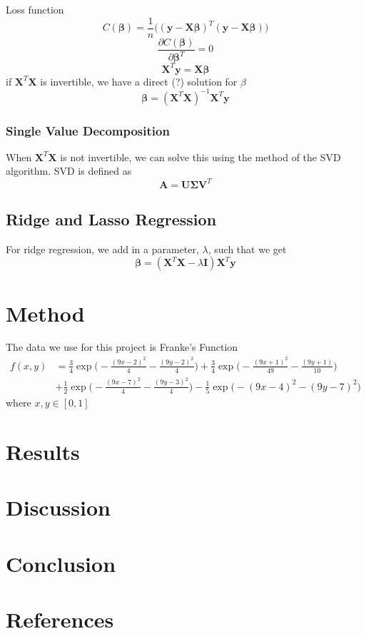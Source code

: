 \documentclass{article}
\begin{document}
Loss function
\begin{equation*}
    C(\mathbf{\beta}) = \frac{1}{n}\Big((\mathbf{y} - \mathbf{X\beta})^T(\mathbf{y} - \mathbf{X\beta})\Big)
\end{equation*}
\begin{equation*}
    \frac{\partial C(\mathbf{\beta})}{\partial \mathbf{\beta}^T} = 0
\end{equation*}
\begin{equation*}
    \mathbf{X}^T\mathbf{y} = \mathbf{X\beta}
\end{equation*}
if $\mathbf{X}^T\mathbf{X}$ is invertible, we have a direct (?) solution for $\beta$
\begin{equation*}
    \mathbf{\beta} = (\mathbf{X}^T\mathbf{X})^{-1}\mathbf{X}^T\mathbf{y}
\end{equation*}

\subsubsection{Single Value Decomposition}
When $\mathbf{X}^T\mathbf{X}$ is not invertible, we can solve this using the method of the SVD algorithm. SVD is defined as
\begin{equation*}
    \mathbf{A} = \mathbf{U}\mathbf{\Sigma}\mathbf{V}^T
\end{equation*}
\subsection{Ridge and Lasso Regression}
For ridge regression, we add in a parameter, $\lambda$, such that we get
\begin{equation*}
    \mathbf{\beta} = (\mathbf{X}^T\mathbf{X} - \lambda\mathbf{I})\mathbf{X}^T\mathbf{y}
\end{equation*}
\section{Method}
The data we use for this project is Franke's Function
\begin{equation*}
    \begin{split}
        f(x,y) & = \frac{3}{4}\exp\Bigg(-\frac{(9x-2)^2}{4} - \frac{(9y-2)^2}{4}\Bigg) + \frac{3}{4}\exp\Bigg(-\frac{(9x+1)^2}{49} - \frac{(9y+1)}{10}\Bigg) \\
        & + \frac{1}{2}\exp\Bigg(-\frac{(9x-7)^2}{4} - \frac{(9y-3)^2}{4}\Bigg) - \frac{1}{5}\exp\Bigg(-(9x-4)^2 - (9y-7)^2\Bigg)
    \end{split}
\end{equation*}
where $x,y \in [0,1]$
\section{Results}
\section{Discussion}
\section{Conclusion}
\section{References}

\end{document}

